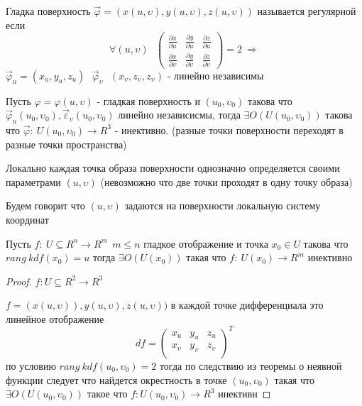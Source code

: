 \begin{define}
  Гладка поверхность $\vec \varphi = (x(u, \upsilon), y(u, \upsilon),
  z(u, \upsilon))$ называется регулярной если
  $$
  \forall (u, \upsilon) ~~~
  \left(
  \begin{array}{ccc}
    \frac{\partial x}{\partial u} & \frac{\partial y}{\partial u} &
    \frac{\partial z}{\partial u} \\
    \frac{\partial x}{\partial \upsilon} &
    \frac{\partial y}{\partial \upsilon} &
    \frac{\partial z}{\partial \upsilon}
  \end{array}
  \right) = 2 ~ \Rightarrow
  $$
  $\vec \varphi_u = (x_u, y_u, z_u) ~~~ \vec \varphi_{\upsilon} ~~~
  (x_{\upsilon}, z_{\upsilon}, z_{\upsilon})$ - линейно независимы
\end{define}

\begin{theorem}
  Пусть $\varphi = \varphi(u, \upsilon)$ - гладкая поверхность и
  $(u_0, \upsilon_0)$ такова что $\vec \varphi_{u} (u_0, \upsilon_0),
  \vec \varepsilon_{\upsilon} (u_0, \upsilon_0)$ линейно независисмы, тогда
  $\exists O(U(u_0, \upsilon_0))$ такова что $\vec \varphi :~ U(u_0,
  \upsilon_0) \to R^3$ - инективно. (разные точки поверхности переходят в
  разные точки пространства)
\end{theorem}

\begin{block}[Следствие]
  Локально каждая точка образа поверхности однозначно определяется своими
  параметрами $(u, \upsilon)$ (невозможно что две точки проходят в одну точку
  образа)

  Будем говорит что $(u, \upsilon)$ задаются на поверхности локальную систему
  координат
\end{block}

\begin{theorem}
  Пусть $f: ~ U \subseteq R^n \to R^m ~~ m \le n$ гладкое отображение и точка
  $x_0 \in U$ такова что $rang ~ kdf(x_0) = u$ тогда $\exists O(U(x_0))$
  такая что $f:~ U(x_0) \to R^m$ инективно
\end{theorem}

\begin{proof}
  $f: U \subseteq R^2 \to R^3$

  $f = (x(u, \upsilon)), y(u, \upsilon), z(u, \upsilon))$ в каждой точке
  дифференциала это линейное отображение
  $$
  df =
  \left(
  \begin{array}{ccc}
    x_u & y_u & z_u \\
    x_{\upsilon} & y_{\upsilon} & z_{\upsilon} \\
  \end{array}
  \right)^T
  $$
  по условию $rang ~ kdf(u_0, \upsilon_0) = 2$ тогда по следствию из теоремы о
  неявной функции следует что найдется окрестность в точке $(u_0, \upsilon_0)$
  такая что $\exists O(U(u_0, \upsilon_0))$ такое что $f: U(u_0,
  \upsilon_0) \to R^3$ инективн
\end{proof}

